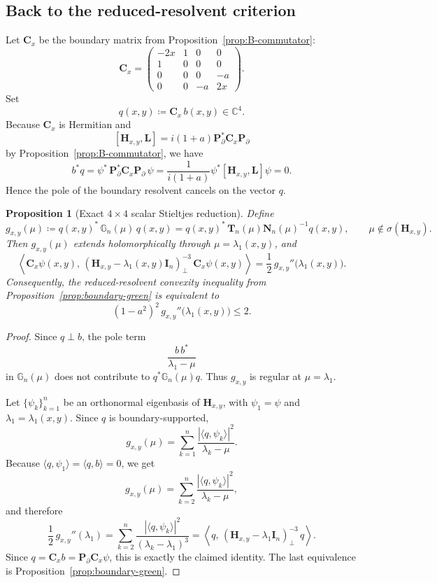 \documentclass[11pt]{article}
\newtheorem{proposition}[theorem]{Proposition}
\begin{document}
\subsection*{Back to the reduced-resolvent criterion}

Let \(\mathbf C_x\) be the boundary matrix from Proposition~\ref{prop:B-commutator}:
\[
\mathbf C_x=
\begin{pmatrix}
-2x&1&0&0\\
1&0&0&0\\
0&0&0&-a\\
0&0&-a&2x
\end{pmatrix}.
\]
Set
\[
q(x,y)\coloneqq \mathbf C_x\,b(x,y)\in\mathbb C^4.
\]
Because \(\mathbf C_x\) is Hermitian and
\[
[\mathbf H_{x,y},\mathbf L]=i(1+a)\mathbf P_\partial^* \mathbf C_x \mathbf P_\partial
\]
by Proposition~\ref{prop:B-commutator}, we have
\[
b^*q
=
\psi^*\,\mathbf P_\partial^* \mathbf C_x \mathbf P_\partial\,\psi
=
\frac{1}{i(1+a)}\psi^*[\mathbf H_{x,y},\mathbf L]\psi
=0.
\]
Hence the pole of the boundary resolvent cancels on the vector \(q\).

\begin{proposition}[Exact \(4\times4\) scalar Stieltjes reduction]\label{prop:4x4-stieltjes}
Define
\[
g_{x,y}(\mu)\coloneqq
q(x,y)^*\,\mathbb G_n(\mu)\,q(x,y)
=
q(x,y)^*\,\mathbf T_n(\mu)\mathbf N_n(\mu)^{-1}q(x,y),
\qquad
\mu\notin\sigma(\mathbf H_{x,y}).
\]
Then \(g_{x,y}(\mu)\) extends holomorphically through \(\mu=\lambda_1(x,y)\), and
\[
\boxed{
\left\langle
\mathbf C_x\psi(x,y),\,
(\mathbf H_{x,y}-\lambda_1(x,y)\mathbf I_n)^{-3}_{\perp}\,
\mathbf C_x\psi(x,y)
\right\rangle
=
\frac12\,g_{x,y}''\bigl(\lambda_1(x,y)\bigr).
}
\]
Consequently, the reduced-resolvent convexity inequality from
Proposition~\ref{prop:boundary-green} is equivalent to
\[
\boxed{
(1-a^2)^2\,g_{x,y}''\bigl(\lambda_1(x,y)\bigr)\le 2.
}
\]
\end{proposition}

\begin{proof}
Since \(q\perp b\), the pole term
\[
\frac{b\,b^*}{\lambda_1-\mu}
\]
in \(\mathbb G_n(\mu)\) does not contribute to \(q^*\mathbb G_n(\mu)q\). Thus \(g_{x,y}\) is regular at
\(\mu=\lambda_1\).

Let \(\{\psi_k\}_{k=1}^n\) be an orthonormal eigenbasis of \(\mathbf H_{x,y}\), with
\(\psi_1=\psi\) and \(\lambda_1=\lambda_1(x,y)\). Since \(q\) is boundary-supported,
\[
g_{x,y}(\mu)
=
\sum_{k=1}^n \frac{|\langle q,\psi_k\rangle|^2}{\lambda_k-\mu}.
\]
Because \(\langle q,\psi_1\rangle=\langle q,b\rangle=0\), we get
\[
g_{x,y}(\mu)
=
\sum_{k=2}^n \frac{|\langle q,\psi_k\rangle|^2}{\lambda_k-\mu},
\]
and therefore
\[
\frac12\,g_{x,y}''(\lambda_1)
=
\sum_{k=2}^n
\frac{|\langle q,\psi_k\rangle|^2}{(\lambda_k-\lambda_1)^3}
=
\left\langle
q,\,
(\mathbf H_{x,y}-\lambda_1\mathbf I_n)^{-3}_{\perp}\,
q
\right\rangle.
\]
Since \(q=\mathbf C_x b=\mathbf P_\partial \mathbf C_x \psi\), this is exactly the claimed identity.
The last equivalence is Proposition~\ref{prop:boundary-green}.
\end{proof}
\end{document}
